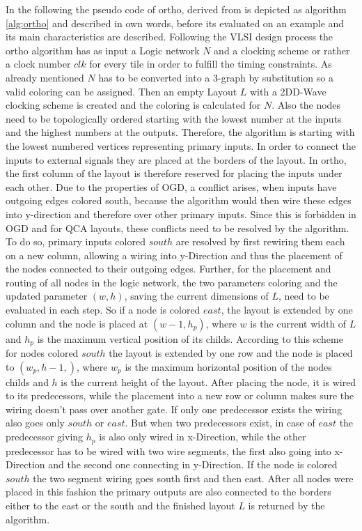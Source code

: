 In the following the pseudo code of ortho, derived from \cite{ortho} is depicted as algorithm \ref{alg:ortho} and described in own words, before its evaluated on an example and its main characteristics are described. Following the VLSI design process the ortho algorithm has as input a Logic network $N$ and a clocking scheme or rather a clock number $clk$ for every tile in order to fulfill the timing constraints. As already mentioned $N$ has to be converted into a 3-graph by substitution so a valid coloring can be assigned. Then an empty Layout $L$ with a 2DD-Wave clocking scheme is created and the coloring is calculated for $N$. Also the nodes need to be topologically ordered starting with the lowest number at the inputs and the highest numbers at the outputs. Therefore, the algorithm is starting with the lowest numbered vertices representing primary inputs. In order to connect the inputs to external signals they are placed at the borders of the layout. In ortho, the first column of the layout is therefore reserved for placing the inputs under each other. Due to the properties of OGD, a conflict arises, when inputs have outgoing edges colored south, because the algorithm would then wire these edges into y-direction and therefore over other primary inputs. Since this is forbidden in OGD and for QCA layouts, these conflicts need to be resolved by the algorithm. To do so, primary inputs colored $south$ are resolved by first rewiring them each on a new column, allowing a wiring into y-Direction and thus the placement of the nodes connected to their outgoing edges. Further, for the placement and routing of all nodes in the logic network, the two parameters coloring and the updated parameter $(w, h)$, saving the current dimensions of $L$, need to be evaluated in each step. So if a node is colored $east$, the layout is extended by one column and the node is placed at $(w-1, h_p)$, where $w$ is the current width of $L$ and $h_p$ is the maximum vertical position of its childs. According to this scheme for nodes colored $south$ the layout is extended by one row and the node is placed to $(w_p, h-1,)$, where $w_p$ is the maximum horizontal position of the nodes childs and $h$ is the current height of the layout. After placing the node, it is wired to its predecessors, while the placement into a new row or column makes sure the wiring doesn't pass over another gate. If only one predecessor exists the wiring also goes only $south$ or $east$. But when two predecessors exist, in case of $east$ the predecessor giving $h_p$ is also only wired in x-Direction, while the other predecessor has to be wired with two wire segments, the first also going into x-Direction and the second one connecting in y-Direction. If the node is colored $south$ the two segment wiring goes south first and then east. After all nodes were placed in this fashion the primary outputs are also connected to the borders either to the east or the south and the finished layout $L$ is returned by the algorithm.

